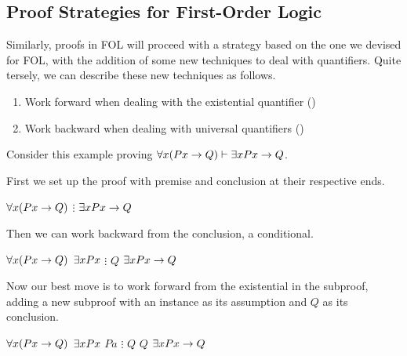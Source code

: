\subsection{Proof Strategies for First-Order Logic}

Similarly, proofs in FOL will proceed with a strategy based on the one we
devised for FOL, with the addition of some new techniques to deal with
quantifiers. Quite tersely, we can describe these new techniques as follows.

\begin{enumerate}
\item Work forward when dealing with the existential quantifier (\eexists)
\item Work backward when dealing with universal quantifiers (\eforall)
\end{enumerate}

Consider this example proving $\forall x(Px\rightarrow Q)\vdash\exists x Px\rightarrow Q$.

First we set up the proof with premise and conclusion at their respective ends.

\begin{fitchproof}
   {$\forall x(Px\rightarrow Q)$} 
   {$\vdots$}
   {$\exists x Px\rightarrow Q$}
\end{fitchproof}

Then we can work backward from the conclusion, a conditional.

\begin{fitchproof}
   {$\forall x(Px\rightarrow Q)$} 
  \open
   {$\exists x Px$}          
   {$\vdots$}
   {$Q$}
  \close
   {$\exists x Px\rightarrow Q$} 
\end{fitchproof}

Now our best move is to work forward from the existential in the subproof,
adding a new subproof with an instance as its assumption and $Q$ as its
conclusion.

\begin{fitchproof}
   {$\forall x(Px\rightarrow Q)$} 
  \open
   {$\exists x Px$}          
  \open
   {$Pa$}                     
   {$\vdots$}
   {$Q$}
  \close
   {$Q$}                     
  \close
   {$\exists x Px\rightarrow Q$} 
\end{fitchproof}

